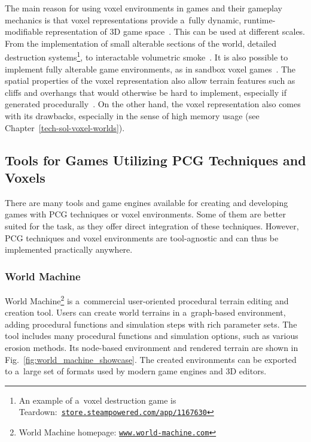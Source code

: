 The main reason for using voxel environments in games and their gameplay mechanics is that voxel representations provide a~fully dynamic, runtime-modifiable representation of 3D game space~\cite{aokana_voxel_engine}. This can be used at different scales. From the implementation of small alterable sections of the world, detailed destruction systems\footnote{An example of a~voxel destruction game is Teardown:~\href{https://store.steampowered.com/app/1167630/Teardown/}{\texttt{store.steampowered.com/app/1167630}}}, to interactable volumetric smoke~\cite{voxel_smoke}. It is also possible to implement fully alterable game environments, as in sandbox voxel games~\cite{bloxel_bachelor_thesis}. The spatial properties of the voxel representation also allow terrain features such as cliffs and overhangs that would otherwise be hard to implement, especially if generated procedurally~\cite{volumetric_terrains_shape_grammars}. On the other hand, the voxel representation also comes with its drawbacks, especially in the sense of high memory usage (see Chapter~\ref{tech-sol-voxel-worlds}).


\subsection{Tools for Games Utilizing PCG Techniques and Voxels}
There are many tools and game engines available for creating and developing games with PCG techniques or voxel environments. Some of them are better suited for the task, as they offer direct integration of these techniques. However, PCG techniques and voxel environments are tool-agnostic and can thus be implemented practically anywhere.


\subsubsection{World Machine}
World Machine\footnote{World Machine homepage: \href{https://www.world-machine.com/}{\texttt{www.world-machine.com}}} is a~commercial user-oriented procedural terrain editing and creation tool. Users can create world terrains in a~graph-based environment, adding procedural functions and simulation steps with rich parameter sets. The tool includes many procedural functions and simulation options, such as various erosion methods. Its node-based environment and rendered terrain are shown in Fig.~\ref{fig:world_machine_showcase}. The created environments can be exported to a~large set of formats used by modern game engines and 3D editors.

